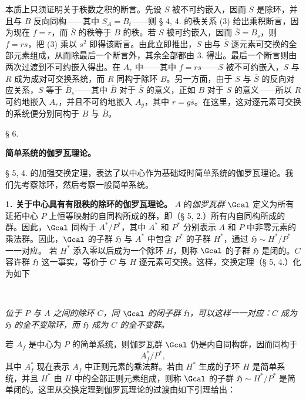 本质上只须证明关于秩数之积的断言。先设 \(S\) 被不可约嵌入，因而 \(\overline S\) 是除环，并且与 \(B\) 反向同构——其中 \(S_A=B_t\)——则 § 4, 4. 的秩关系 (3) 给出乘积断言，因为现在 \(f=r\)，而 \(\overline S\) 的秩等于 \(B\) 的秩。若 \(S\) 被可约嵌入，因而 \(\overline S=B_s\)，则 \(f=rs\)，把 (3) 乘以 \(s^2\) 即得该断言。由此立即推出，\(S\) 由与 \(\overline S\) 逐元素可交换的全部元素组成，从而除最后一个断言外，其余全部都由 3. 得出。最后一个断言则由两次过渡到不可约嵌入得出。在 \(A_r\) 中——其中 \(f=rs\)——\(S\) 被不可约嵌入，\(S\) 与 \(R\) 成为成对可交换系统，而 \(R\) 同构于除环 \(B\)。另一方面，由于 \(S\) 与 \(\overline S\) 的反向对应关系，\(S\) 等于 \(\overline B_s\)——其中 \(\overline B\) 对于 \(\overline S\) 的意义，正如 \(B\) 对于 \(S\) 的意义——所以 \(R\) 可约地嵌入 \(A_r\)，并且不可约地嵌入 \(A_g\)，其中 \(r=g\overline s\)。在这里，这对逐元素可交换的系统便分别同构于 \(B\) 与 \(\overline B\)。

\begin{center}
§ 6.

\textbf{简单系统的伽罗瓦理论。}
\end{center}

§ 5, 4. 的加强交换定理，表达了以中心作为基础域时简单系统的伽罗瓦理论。我们先考察除环，然后考察一般简单系统。

\noindent\textbf{1. 关于中心具有有限秩的除环的伽罗瓦理论。} \(A\) 的\emph{伽罗瓦群} \(\Gcal\) 定义为所有延拓中心 \(P\) 上恒等映射的自同构所成的群，即（§ 5, 2.）所有内自同构所成的群。因此，\(\Gcal\) 同构于 \(A^*/P^*\)，其中 \(A^*\) 和 \(P^*\) 分别表示 \(A\) 和 \(P\) 中非零元素的乘法群。因此，\(\Gcal\) 的子群 \(\mathfrak H\) 与 \(A^*\) 中包含 \(P^*\) 的子群 \(H^*\)，通过 \(\mathfrak H\sim H^*/P^*\) 一一对应。
若 \(H^*\) 添入零以后成为一个除环 \(H\)，则称 \(\Gcal\) 的子群 \(\mathfrak H\) 是闭的。\(C\) 容许群 \(\mathfrak H\) 这一事实，等价于 \(C\) 与 \(H\) 逐元素可交换。这样，交换定理（§ 5, 4.）化为如下

\begin{center}
\textbf{\
}
\end{center}

\emph{位于 \(P\) 与 \(A\) 之间的除环 \(C\)，同 \(\Gcal\) 的闭子群 \(\mathfrak H\)，可以这样一一对应：\(C\) 成为 \(\mathfrak H\) 的全不变除环，而 \(\mathfrak H\) 成为 \(C\) 的全不变群。}

\noindent\textbf{}
若 \(A_f\) 是中心为 \(P\) 的简单系统，则伽罗瓦群 \(\Gcal\) 仍是内自同构群，因而同构于
\[
        A_f^*/P^*,
\]
其中 \(A_f^*\) 现在表示 \(A_f\) 中正则元素的乘法群。若由 \(H^*\) 生成的子环 \(H\) 是简单系统，并且 \(H^*\) 由 \(H\) 中的全部正则元素组成，则称 \(\Gcal\) 的子群 \(\mathfrak H\sim H^*/P^*\) 是简单闭的。这里从交换定理到伽罗瓦理论的过渡由如下引理给出：

